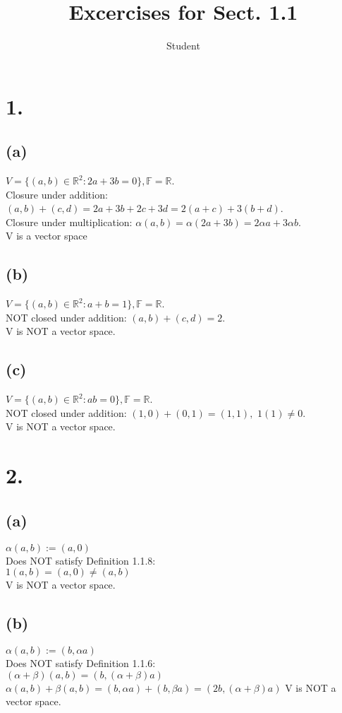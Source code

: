 \documentclass{article}
\title{Excercises for Sect. 1.1}
\author{Student}
\begin{document}
\maketitle
\section*{1.}
\subsection*{(a)}
$V = \{(a,b) \in \mathbb{R}^2 : 2a+3b = 0\}, \mathbb{F} = \mathbb{R}$.\\
Closure under addition: $(a,b) + (c,d) = 2a +3b + 2c + 3d = 2(a+c)+3(b+d)$.\\
Closure under multiplication: $\alpha(a,b) = \alpha(2a+3b) = 2\alpha a + 3\alpha b$.\\
V is a vector space
\subsection*{(b)}
$V = \{(a,b) \in \mathbb{R}^2 : a+b = 1\}, \mathbb{F} = \mathbb{R}$.\\
NOT closed under addition: $(a,b) + (c,d) = 2$.\\
V is NOT a vector space.
\subsection*{(c)}
$V = \{(a,b) \in \mathbb{R}^2 : ab = 0\}, \mathbb{F} = \mathbb{R}$.\\
NOT closed under addition: $(1,0) + (0,1) = (1,1),$  $1(1) \ne 0$.\\
V is NOT a vector space.

\section*{2.}
\subsection*{(a)}
$\alpha(a,b) := (a,0)$\\
Does NOT satisfy Definition 1.1.8:\\ 
$1(a,b) = (a,0) \ne (a,b)$\\ 
V is NOT a vector space.
\subsection*{(b)}
$\alpha(a,b) := (b,\alpha a)$\\
Does NOT satisfy Definition 1.1.6:\\ 
$(\alpha + \beta)(a,b) = (b, (\alpha+\beta)a)$\\
$\alpha(a,b) + \beta(a,b) = (b, \alpha a) + (b, {\beta}a) = (2b, (\alpha+\beta)a)$ 
V is NOT a vector space.
\end{document}
